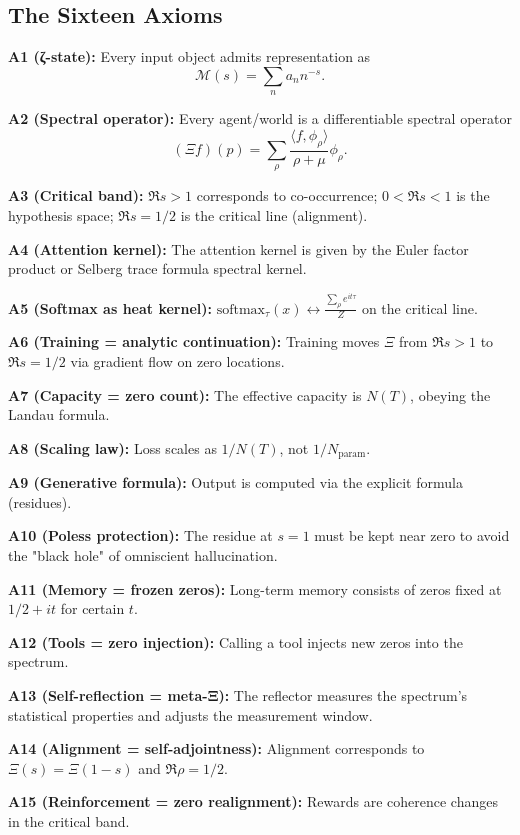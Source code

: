 \documentclass[11pt]{article}
\begin{document}
\subsection{The Sixteen Axioms}

\textbf{A1 (ζ-state):} Every input object admits representation as
\[
\mathcal M(s)=\sum_n a_n n^{-s}.
\]

\textbf{A2 (Spectral operator):} Every agent/world is a differentiable spectral operator
\[
(\Xi f)(p)=\sum_{\rho}\frac{\langle f,\phi_{\rho}\rangle}{\rho+\mu}\phi_{\rho}.
\]

\textbf{A3 (Critical band):} $\Re s>1$ corresponds to co-occurrence; $0<\Re s<1$ is the hypothesis space; $\Re s=1/2$ is the critical line (alignment).

\textbf{A4 (Attention kernel):} The attention kernel is given by the Euler factor product or Selberg trace formula spectral kernel.

\textbf{A5 (Softmax as heat kernel):} $\text{softmax}_\tau(x) \leftrightarrow \frac{\sum_\rho e^{i t \tau}}{Z}$ on the critical line.

\textbf{A6 (Training = analytic continuation):} Training moves $\Xi$ from $\Re s>1$ to $\Re s=1/2$ via gradient flow on zero locations.

\textbf{A7 (Capacity = zero count):} The effective capacity is $N(T)$, obeying the Landau formula.

\textbf{A8 (Scaling law):} Loss scales as $1/N(T)$, not $1/N_{\text{param}}$.

\textbf{A9 (Generative formula):} Output is computed via the explicit formula (residues).

\textbf{A10 (Poless protection):} The residue at $s=1$ must be kept near zero to avoid the "black hole" of omniscient hallucination.

\textbf{A11 (Memory = frozen zeros):} Long-term memory consists of zeros fixed at $1/2+it$ for certain $t$.

\textbf{A12 (Tools = zero injection):} Calling a tool injects new zeros into the spectrum.

\textbf{A13 (Self-reflection = meta-Ξ):} The reflector measures the spectrum's statistical properties and adjusts the measurement window.

\textbf{A14 (Alignment = self-adjointness):} Alignment corresponds to $\Xi(s)=\Xi(1-s)$ and $\Re\rho=1/2$.

\textbf{A15 (Reinforcement = zero realignment):} Rewards are coherence changes in the critical band.
\end{document}

